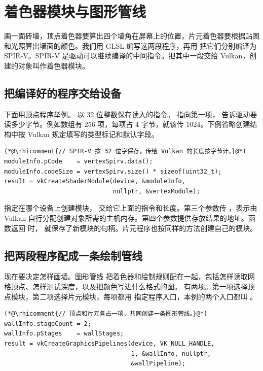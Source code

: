 \clearpage
\section{着色器模块与图形管线}\label{sec:shader-api}
画一面砖墙，顶点着色器要算出四个墙角在屏幕上的位置，片元着色器要根据贴图和光照算出墙面的颜色。我们用 GLSL 编写这两段程序，再用  把它们分别编译为 SPIR-V。SPIR-V 是驱动可以继续编译的中间指令。把其中一段交给 Vulkan，创建的对象叫作着色器模块。

\subsection{把编译好的程序交给设备}
下面用顶点程序举例。 以 32 位整数保存读入的指令。 指向第一项， 告诉驱动要读多少字节。例如数组有 256 项，每项占 4 字节，就该传 1024。下例省略创建结构中按 Vulkan 规定填写的类型标记和默认字段。
\begin{lstlisting}
(*@\rhicomment{// SPIR-V 按 32 位字保存，传给 Vulkan 的长度按字节计。}@*)
moduleInfo.pCode    = vertexSpirv.data();
moduleInfo.codeSize = vertexSpirv.size() * sizeof(uint32_t);
result = vkCreateShaderModule(device, &moduleInfo,
                              nullptr, &vertexModule);
\end{lstlisting}

 指定在哪个设备上创建模块， 交给它上面的指令和长度。第三个参数传 ，表示由 Vulkan 自行分配创建对象所需的主机内存。第四个参数提供存放结果的地址。函数返回  时， 就保存了新模块的句柄。片元程序也按同样的方法创建自己的模块。

\subsection{把两段程序配成一条绘制管线}
现在要决定怎样画墙。图形管线 把着色器和绘制规则配在一起，包括怎样读取网格顶点、怎样测试深度，以及把颜色写进什么格式的图。 有两项。第一项选择顶点模块，第二项选择片元模块，每项都用  指定程序入口，本例的两个入口都叫 。
\begin{lstlisting}
(*@\rhicomment{// 顶点和片元各占一项，共同创建一条图形管线。}@*)
wallInfo.stageCount = 2;
wallInfo.pStages    = wallStages;
result = vkCreateGraphicsPipelines(device, VK_NULL_HANDLE,
                                   1, &wallInfo, nullptr,
                                   &wallPipeline);
\end{lstlisting}

